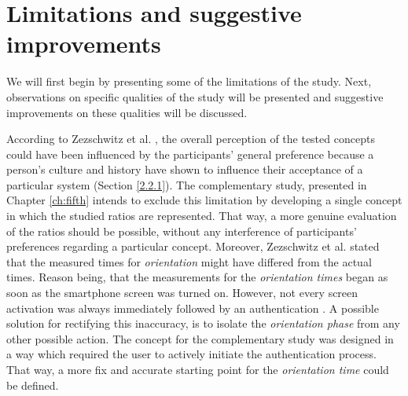 \section{Limitations and suggestive improvements} \label{3.3}

We will first begin by presenting some of the limitations of the study. Next, observations on specific qualities of the study will be presented and suggestive improvements on these qualities will be discussed. 

According to Zezschwitz et al. \cite{Zezschwitz}, the overall perception of the tested concepts could have been influenced by the participants' general preference \cite{Zezschwitz} because a person's culture and history have shown to influence their acceptance of a particular system \cite{Harbach:2016} (Section \ref{2.2.1}). The complementary study, presented in Chapter \ref{ch:fifth} intends to exclude this limitation by developing a single concept in which the studied ratios are represented. That way, a more genuine evaluation of the ratios should be possible, without any interference of participants' preferences regarding a particular concept. Moreover, Zezschwitz et al. \cite{Zezschwitz} stated that the measured times for \textit{orientation} might have differed from the actual times. Reason being, that the measurements for the \textit{orientation times} began as soon as the smartphone screen was turned on. However, not every screen activation was always immediately followed by an authentication \cite{Zezschwitz}. A possible solution for rectifying this inaccuracy, is to isolate the \textit{orientation phase} from any other possible action. The concept for the complementary study was designed in a way which required the user to actively initiate the authentication process. That way, a more fix and accurate starting point for the \textit{orientation time} could be defined.\\

